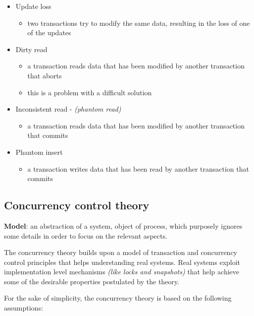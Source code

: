 \documentclass[english]{article}
\begin{document}
\begin{itemize}
  \item Update loss
        \begin{itemize}
          \item two transactions try to modify the same data, resulting in the loss of one of the updates
        \end{itemize}
  \item Dirty read
        \begin{itemize}
          \item a transaction reads data that has been modified by another transaction that aborts
          \item this is a problem with a difficult solution
        \end{itemize}
  \item Inconsistent read - \textit{(phantom read)}
        \begin{itemize}
          \item a transaction reads data that has been modified by another transaction that commits
        \end{itemize}
  \item Phantom insert
        \begin{itemize}
          \item a transaction writes data that has been read by another transaction that commits
        \end{itemize}
\end{itemize}

\subsection{Concurrency control theory}

\textbf{Model}: an abstraction of a system, object of process, which purposely ignores some details in order to focus on the relevant aspects.

The concurrency theory builds upon a model of transaction and concurrency control principles that helps understanding real systems.
Real systems exploit implementation level mechanisms \textit{(like locks and snapshots)} that help achieve some of the desirable properties postulated by the theory.

For the sake of simplicity, the concurrency theory is based on the following assumptions:
\end{document}
